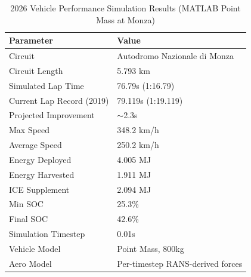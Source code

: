 \begin{table}[h]
\centering
\caption{2026 Vehicle Performance Simulation Results (MATLAB Point Mass at Monza)}
\vspace{0.2cm}
\begin{tabularx}{\textwidth}{@{}Xl@{}}
\toprule
\textbf{Parameter} & \textbf{Value} \\
\midrule
Circuit & Autodromo Nazionale di Monza \\
Circuit Length & 5.793 km \\
Simulated Lap Time & 76.79s (1:16.79) \\
Current Lap Record (2019) & 79.119s (1:19.119) \\
Projected Improvement & $\sim$2.3s \\
Max Speed & 348.2 km/h \\
Average Speed & 250.2 km/h \\
Energy Deployed & 4.005 MJ \\
Energy Harvested & 1.911 MJ \\
ICE Supplement & 2.094 MJ \\
Min SOC & 25.3\% \\
Final SOC & 42.6\% \\
Simulation Timestep & 0.01s \\
Vehicle Model & Point Mass, 800kg \\
Aero Model & Per-timestep RANS-derived forces \\
\bottomrule
\end{tabularx}
\label{tab:monza_results}
\end{table}

